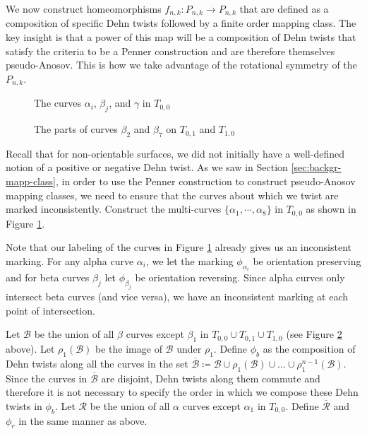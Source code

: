 
We now construct homeomorphisms $f_{n,k}: P_{n,k} \to P_{n,k}$ that are defined as a composition of specific Dehn twists
followed by a finite order mapping class. The key insight is that a power of this map will be a composition of
Dehn twists that satisfy the criteria to be a Penner construction and are therefore themselves pseudo-Anosov. This is how we take
advantage of the rotational symmetry of the $P_{n,k}$.

\begin{figure}[h]
    \centering
    \caption{The curves $\alpha_i$,  $\beta_j$, and $\gamma$ in $T_{0,0}$}
    \label{fig:curves}
\end{figure}

\begin{figure}[h]
    \centering
    \caption{The parts of curves $\beta_2$ and $\beta_7$ on $T_{0,1}$ and $T_{1,0}$}
    \label{fig:extracurves}
\end{figure}

Recall that for non-orientable surfaces, we did not initially have a well-defined notion of a positive or
negative Dehn twist. As we saw in Section \ref{sec:backgr-mapp-class}, in order to use the Penner
construction to construct pseudo-Anosov mapping classes, we need to ensure that the curves about which we twist are marked inconsistently. Construct the multi-curves $\{\alpha_1,\cdots,\alpha_8\}$ in $T_{0,0}$ as shown in Figure \ref{fig:curves}.

Note that our
labeling of the curves in Figure \ref{fig:curves} already gives us an inconsistent marking. For any alpha curve $\alpha_i$, we let the
marking $\phi_{\alpha_i}$ be orientation preserving and for beta curves $\beta_j$ let $\phi_{\beta_j}$ be
orientation reversing. Since alpha curves only intersect beta curves (and vice versa), we have an inconsistent
marking at each point of intersection.

Let $\mathcal{B}$ be the union of all $\beta$ curves except $\beta_1$ in $T_{0,0} \cup T_{0,1} \cup T_{1,0}$
(see Figure \ref{fig:extracurves} above). Let $\rho_1(\mathcal{B})$ be the image of $\mathcal{B}$ under $\rho_1$. Define $\phi_b$
as the composition of Dehn twists along all the curves in the set
$\overline{\mathcal{B}} \coloneqq \mathcal{B} \cup \rho_1(\mathcal{B}) \cup \dots \cup
\rho_1^{n-1}(\mathcal{B})$. Since the curves in $\overline{\mathcal{B}}$ are disjoint, Dehn twists along them
commute and therefore it is not necessary to specify the order in which we compose these Dehn twists in
$\phi_b$. Let $\mathcal{R}$ be the union of all $\alpha$ curves except $\alpha_1$ in $T_{0,0}$. Define
$\overline{\mathcal{R}}$ and $\phi_r$ in the same manner as above.

